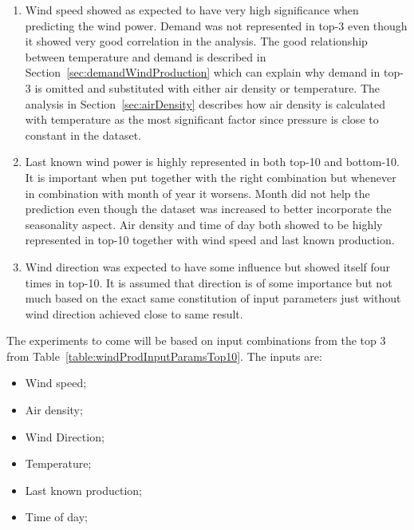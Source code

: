 \begin{enumerate}
\item Wind speed showed as expected to have very high significance when predicting the wind power. Demand was not represented in top-3 even though it showed very good correlation in the analysis. The good relationship between temperature and demand is described in Section~\ref{sec:demandWindProduction} which can explain why demand in top-3 is omitted and substituted with either air density or temperature. The analysis in Section~\ref{sec:airDensity} describes how air density is calculated with temperature as the most significant factor since pressure is close to constant in the dataset.   
\item Last known wind power is highly represented in both top-10 and bottom-10. It is important when put together with the right combination but whenever in combination with month of year it worsens. Month did not help the prediction even though the dataset was increased to better incorporate the seasonality aspect. Air density and time of day both showed to be highly represented in top-10 together with wind speed and last known production.
\item Wind direction was expected to have some influence but showed itself four times in top-10. It is assumed that direction is of some importance but not much based on the exact same constitution of input parameters just without wind direction achieved close to same result.
\end{enumerate}

The experiments to come will be based on input combinations from the top 3 from Table~\ref{table:windProdInputParamsTop10}. The inputs are:
\begin{itemize}
\item Wind speed;
\item Air density;
\item Wind Direction;
\item Temperature;
\item Last known production;
\item Time of day;
\end{itemize}
\newpage
